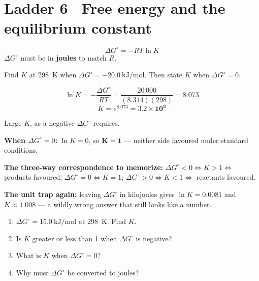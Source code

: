 \documentclass{apchem-worksheet}
\begin{document}
\section*{\sffamily Ladder 6 \textbullet\ Free energy and the equilibrium constant}

\[ \Delta G^\circ = -RT\ln K \]
$\Delta G^\circ$ must be in \textbf{joules} to match $R$.

\begin{workedexample}
Find $K$ at \SI{298}{\kelvin} when
$\Delta G^\circ = \SI{-20.0}{\kilo\joule\per\mole}$. Then state $K$ when
$\Delta G^\circ = 0$.

\[ \ln K = -\frac{\Delta G^\circ}{RT}
   = \frac{20\,000}{(8.314)(298)} = \num{8.073} \]
\[ K = e^{8.073} = \mathbf{3.2\times10^{3}} \]

Large $K$, as a negative $\Delta G^\circ$ requires.

\textbf{When $\Delta G^\circ = 0$:} $\ln K = 0$, so $\mathbf{K = 1}$ ---
neither side favoured under standard conditions.

\textbf{The three-way correspondence to memorize:}
$\Delta G^\circ < 0 \Leftrightarrow K > 1 \Leftrightarrow$ products
favoured;
$\Delta G^\circ = 0 \Leftrightarrow K = 1$;
$\Delta G^\circ > 0 \Leftrightarrow K < 1 \Leftrightarrow$ reactants
favoured.

\textbf{The unit trap again:} leaving $\Delta G^\circ$ in kilojoules gives
$\ln K = 0.0081$ and $K \approx 1.008$ --- a wildly wrong answer that
still looks like a number.
\end{workedexample}

\begin{yourturn}
\begin{enumerate}[leftmargin=*,itemsep=0.5em]
  \item $\Delta G^\circ = \SI{+15.0}{\kilo\joule\per\mole}$ at
        \SI{298}{\kelvin}. Find $K$. \workspace[1.8cm]
  \item Is $K$ greater or less than 1 when $\Delta G^\circ$ is negative?
        \workspace[1.4cm]
  \item What is $K$ when $\Delta G^\circ = 0$? \workspace[1.4cm]
  \item Why must $\Delta G^\circ$ be converted to joules?
        \workspace[1.6cm]
\end{enumerate}
\end{yourturn}
\end{document}
